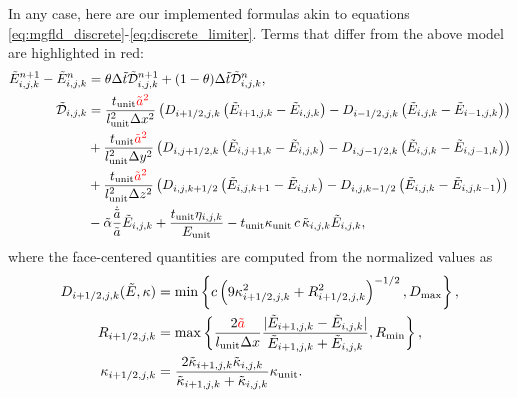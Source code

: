 \documentclass[10pt]{article}
\renewcommand{\(}{\left(}
\renewcommand{\)}{\right)}
\newcommand{\mD}{{\mathcal D}}
\newcommand{\Lunit}{l_{\text{unit}}}
\newcommand{\Tunit}{t_{\text{unit}}}
\newcommand{\Eunit}{E_{\text{unit}}}
\newcommand{\Kunit}{\kappa_{\text{unit}}}
\newcommand{\tK}{\tilde{\kappa}}
\newcommand{\tT}{\tilde{t}}
\newcommand{\tE}{\tilde{E}}
\newcommand{\tA}{\tilde{a}}
\newcommand{\tmD}{\tilde{\mD}}
\newcommand{\talpha}{\tilde{\alpha}}
\begin{document}
In any case, here are our implemented formulas akin to equations 
\eqref{eq:mgfld_discrete}-\eqref{eq:discrete_limiter}.  Terms that
differ from the above model are highlighted in {\color{red} red}:
\begin{align}
  \label{eq:mgfld_implemented}
    \tE_{i,j,k}^{n+1} - \tE_{i,j,k}^n &= \theta \Delta \tT
    \tmD_{i,j,k}^{n+1} + (1-\theta) \Delta \tT \tmD_{i,j,k}^n, \\
  \notag
  \tmD_{i,j,k} &= 
       \frac{\Tunit {\color{red}\tA^2}}{\Lunit^2 \Delta x^2}\(D_{i+1/2,j,k}\(\tE_{i+1,j,k} - \tE_{i,j,k}\) - D_{i-1/2,j,k}\(\tE_{i,j,k} - \tE_{i-1,j,k}\)\) \\
  \notag
    &+ \frac{\Tunit {\color{red}\tA^2}}{\Lunit^2 \Delta y^2}\(D_{i,j+1/2,k}\(\tE_{i,j+1,k} - \tE_{i,j,k}\) - D_{i,j-1/2,k}\(\tE_{i,j,k} - \tE_{i,j-1,k}\)\) \\
  \notag
    &+ \frac{\Tunit {\color{red}\tA^2}}{\Lunit^2 \Delta z^2}\(D_{i,j,k+1/2}\(\tE_{i,j,k+1} - \tE_{i,j,k}\) - D_{i,j,k-1/2}\(\tE_{i,j,k} - \tE_{i,j,k-1}\)\) \\
  \notag
    &- \talpha\frac{\dot{\tA}}{\tA} \tE_{i,j,k} + \frac{\Tunit \eta_{i,j,k}}{\Eunit}
     - \Tunit \Kunit\, c\, \tK_{i,j,k} \tE_{i,j,k},
\end{align}
where the face-centered quantities are computed from the normalized
values as
\begin{align}
  \label{eq:limiter_implemented}
  D_{i+1/2,j,k}(\tE,\kappa) &= \min\left\{ c \left(9\kappa_{i+1/2,j,k}^2 + R_{i+1/2,j,k}^2\right)^{-1/2},
    D_\text{max} \right\},\\
  \notag
  R_{i+1/2,j,k} &= \max\left\{\frac{2{\color{red}\tA}}{\Lunit \Delta x} \frac{|\tE_{i+1,j,k}-\tE_{i,j,k}|}{\tE_{i+1,j,k}+\tE_{i,j,k}}, R_\text{min} \right\}, \\
  \notag
  \kappa_{i+1/2,j,k} &= \frac{2 \tK_{i+1,j,k} \tK_{i,j,k}}{
    \tK_{i+1,j,k} + \tK_{i,j,k}} \Kunit.
\end{align}







\end{document}
